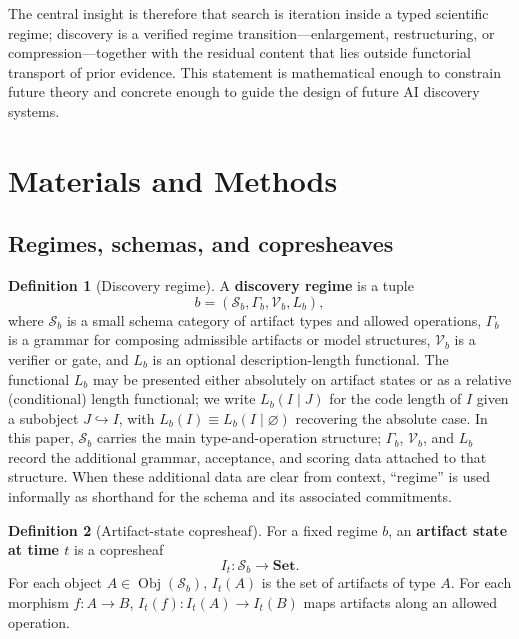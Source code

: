 \documentclass[11pt]{article}
\theoremstyle{definition}
\newtheorem{definition}{Definition}
\newcommand{\Sschema}{\mathcal{S}}
\newcommand{\V}{\mathcal{V}}
\newcommand{\Set}{\mathbf{Set}}
\newcommand{\Obj}{\operatorname{Obj}}
\begin{document}
The central insight is therefore that search is iteration inside a typed scientific regime; discovery is a verified regime transition---enlargement, restructuring, or compression---together with the residual content that lies outside functorial transport of prior evidence.
This statement is mathematical enough to constrain future theory and concrete enough to guide the design of future AI discovery systems.

\section{Materials and Methods}
\label{sec:methods}

\subsection{Regimes, schemas, and copresheaves}

\begin{definition}[Discovery regime]
\label{def:regime}
A \textbf{discovery regime} is a tuple
\[
b=(\Sschema_b,\Gamma_b,\V_b,L_b),
\]
where $\Sschema_b$ is a small schema category of artifact types and allowed operations, $\Gamma_b$ is a grammar for composing admissible artifacts or model structures, $\V_b$ is a verifier or gate, and $L_b$ is an optional description-length functional. The functional $L_b$ may be presented either absolutely on artifact states or as a relative (conditional) length functional; we write $L_b(I\mid J)$ for the code length of $I$ given a subobject $J\hookrightarrow I$, with $L_b(I)\equiv L_b(I\mid\varnothing)$ recovering the absolute case. In this paper, $\Sschema_b$ carries the main type-and-operation structure; $\Gamma_b$, $\V_b$, and $L_b$ record the additional grammar, acceptance, and scoring data attached to that structure. When these additional data are clear from context, ``regime'' is used informally as shorthand for the schema and its associated commitments.
\end{definition}

\begin{definition}[Artifact-state copresheaf]
\label{def:copresheaf}
For a fixed regime $b$, an \textbf{artifact state at time $t$} is a copresheaf
\[
I_t:\Sschema_b\to\Set .
\]
For each object $A\in\Obj(\Sschema_b)$, $I_t(A)$ is the set of artifacts of type $A$. For each morphism $f:A\to B$, $I_t(f):I_t(A)\to I_t(B)$ maps artifacts along an allowed operation.
\end{definition}
\end{document}
